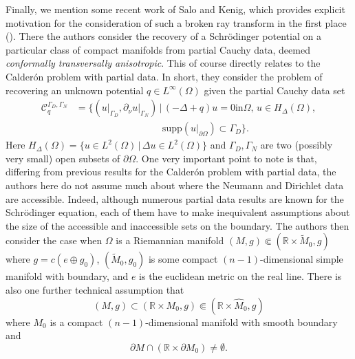 \documentclass[10pt]{amsart}
\theoremstyle{definition}
\theoremstyle{definition}
\theoremstyle{definition}
\begin{document}
Finally, we mention some recent work of Salo and Kenig, which provides explicit motivation for the consideration of such a broken ray transform in the first place (\cite{salokenig}). There the authors consider the recovery of a Schr\"odinger potential on a particular class of compact manifolds from partial Cauchy data, deemed \textit{conformally transversally anisotropic}. This of course directly relates to the Calder\'on problem with partial data. In short, they consider the problem of recovering an unknown potential $q \in L^{\infty}(\Omega)$ given the partial Cauchy data set
\begin{align*}
\mathcal{C}_{q}^{\Gamma_{D}, \Gamma_{N}} & = \{ (u \vert_{\Gamma_{D}}, \partial_{\nu}u \vert_{\Gamma_{N}}) \, | \, (-\Delta + q)u = 0 \mathrm{ in }\Omega,\, u \in H_{\Delta}(\Omega),\\
& \qquad \qquad \qquad \qquad \quad \mathrm{supp}(u \vert_{\partial \Omega}) \subset \Gamma_{D} \}.
\end{align*}
Here $H_{\Delta}(\Omega) = \{ u \in L^{2}(\Omega) \, | \, \Delta u \in L^{2}(\Omega)\}$ and $\Gamma_{D}, \Gamma_{N}$ are two (possibly very small) open subsets of $\partial \Omega$. One very important point to note is that, differing from previous results for the Calder\'on problem with partial data, the authors here do not assume much about where the Neumann and Dirichlet data are accessible. Indeed, although numerous partial data results are known for the Schr\"odinger equation, each of them have to make inequivalent assumptions about the size of the accessible and inaccessible sets on the boundary. The authors then consider the case when $\Omega$ is a Riemannian manifold $(M,g) \Subset (\mathbb{R} \times \widetilde{M}_{0}, g)$ where $g = c(e \oplus g_{0})$, $(\widetilde{M}_{0}, g_{0})$ is some compact $(n-1)$-dimensional simple manifold with boundary, and $e$ is the euclidean metric on the real line. There is also one further technical assumption that
\begin{equation*}
(M,g) \subset (\mathbb{R} \times M_{0}, g) \Subset (\mathbb{R} \times \widehat{M}_{0}, g)
\end{equation*}
where $M_{0}$ is a compact $(n-1)$-dimensional manifold with smooth boundary and
\begin{equation*}
\partial M \cap (\mathbb{R} \times \partial M_{0}) \neq \emptyset.
\end{equation*}
\end{document}
